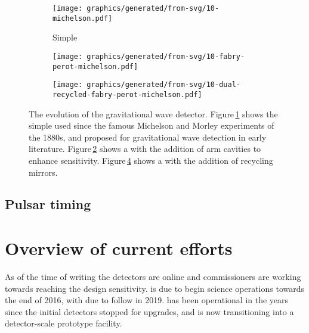 \begin{figure}
  \begin{center}
    \begin{subfigure}{.3\textwidth}
      \texttt{[image: graphics/generated/from-svg/10-michelson.pdf]}
      \caption{Simple \MI{}}
      \label{fig:mi}
    \end{subfigure}
    \hfill
    \begin{subfigure}{.3\textwidth}
      \texttt{[image: graphics/generated/from-svg/10-fabry-perot-michelson.pdf]}
      \caption{\FPMI{}}
      \label{fig:fpmi}
    \end{subfigure}
    \hfill
    \begin{subfigure}{.3\textwidth}
      \texttt{[image: graphics/generated/from-svg/10-dual-recycled-fabry-perot-michelson.pdf]}
      \caption{\DRFPMI{}}
      \label{fig:drfpmi}
    \end{subfigure}
    \caption[The evolution of the gravitational wave detector]{The evolution of the gravitational wave detector. Figure\,\ref{fig:mi} shows the simple \MI{} used since the famous Michelson and Morley experiments of the 1880s, and proposed for gravitational wave detection in early literature. Figure\,\ref{fig:fpmi} shows a \MI{} with the addition of \FP{} arm cavities to enhance sensitivity. Figure\,\ref{fig:drfpmi} shows a \FPMI{} with the addition of recycling mirrors.}
  \end{center}
\end{figure}

\subsection{Pulsar timing}

\section{Overview of current efforts}
As of the time of writing the \ALIGO{} detectors are online and commissioners are working towards reaching the design sensitivity. \AVIRGO{} is due to begin science operations towards the end of 2016, with \KAGRA{} due to follow in 2019. \GEOHF{} has been operational in the years since the initial detectors stopped for upgrades, and is now transitioning into a detector-scale prototype facility.



